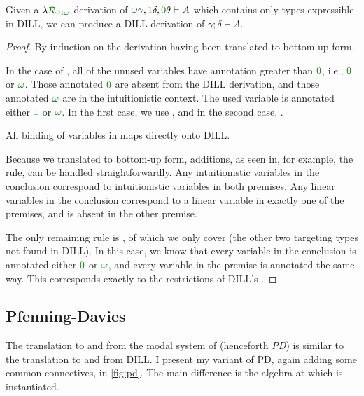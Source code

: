 \begin{proposition}
  Given a $\name_{\instDILL}$ derivation of
  $\gr\omega\gamma, \gr1\delta,
  \gr0\theta \vdash A$ which contains only types expressible
  in DILL, we can produce a DILL derivation of $\gamma; \delta \vdash A$.
\end{proposition}
\begin{proof}
  By induction on the derivation having been translated to bottom-up form.

  In the case of , all of the unused variables have annotation
  greater than $\gr0$, i.e., $\gr0$ or $\gr\omega$.
  Those annotated $\gr0$ are absent from the DILL derivation, and those
  annotated $\gr\omega$ are in the intuitionistic context.
  The used variable is annotated either $\gr1$ or $\gr\omega$.
  In the first case, we use , and in the second case,
  .

  All binding of variables in \name{} maps directly onto DILL\@.

  Because we translated to bottom-up form, additions, as seen in, for example,
  the  rule, can be handled straightforwardly.
  Any intuitionistic variables in the conclusion correspond to intuitionistic
  variables in both premises.
  Any linear variables in the conclusion correspond to a linear variable in
  exactly one of the premises, and is absent in the other premise.

  The only remaining rule is , of which we only cover
   (the other two targeting types not found
  in DILL).
  In this case, we know that every variable in the conclusion is annotated
  either $\gr0$ or $\gr\omega$, and every variable in the premise is
  annotated the same way.
  This corresponds exactly to the restrictions of DILL's .
\end{proof}

\subsection{Pfenning-Davies}\label{sec:trans-pd}

The translation to and from the modal system of \citet{judgmental}
(henceforth \emph{PD}) is similar to the translation to and from DILL\@.
I present my variant of PD, again adding some common connectives, in
\cref{fig:pd}.
The main difference is the algebra at which \name{} is instantiated.

